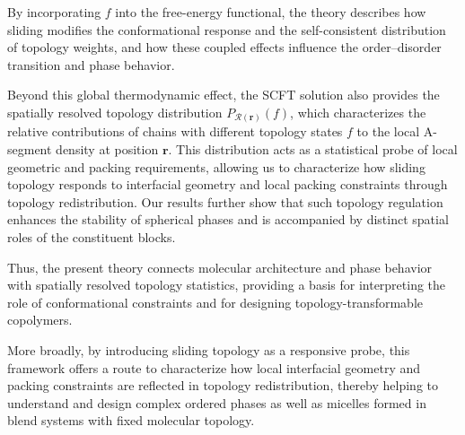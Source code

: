 By incorporating $f$ into the free-energy functional, the theory describes how sliding modifies the conformational response and the self-consistent distribution of topology weights, and how these coupled effects influence the order--disorder transition and phase behavior.

Beyond this global thermodynamic effect, the SCFT solution also provides the spatially resolved topology distribution $P_{\mathcal R(\bm r)}(f)$, which characterizes the relative contributions of chains with different topology states $f$ to the local A-segment density at position $\bm r$.
This distribution acts as a statistical probe of local geometric and packing requirements, allowing us to characterize how sliding topology responds to interfacial geometry and local packing constraints through topology redistribution.
Our results further show that such topology regulation enhances the stability of spherical phases and is accompanied by distinct spatial roles of the constituent blocks.

Thus, the present theory connects molecular architecture and phase behavior with spatially resolved topology statistics, providing a basis for interpreting the role of conformational constraints and for designing topology-transformable copolymers.

More broadly, by introducing sliding topology as a responsive probe, this framework offers a route to characterize how local interfacial geometry and packing constraints are reflected in topology redistribution, thereby helping to understand and design complex ordered phases as well as micelles formed in blend systems with fixed molecular topology.

